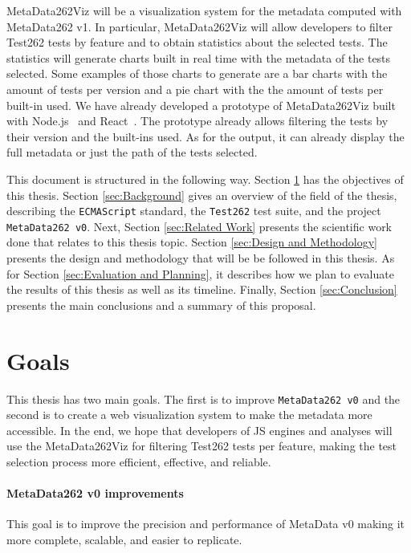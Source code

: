 \documentclass[runningheads]{llncs}
\begin{document}
MetaData262Viz will be a visualization system for the metadata computed with MetaData262 v1. In particular, MetaData262Viz will allow developers to filter Test262 tests by feature and to obtain statistics about the selected tests. The statistics will generate charts built in real time with the metadata of the tests selected. Some examples of those charts to generate are a bar charts with the amount of tests per version and a pie chart with the the amount of tests per built-in used.
We have already developed a prototype of MetaData262Viz built with Node.js~\cite{Node.js} and React~\cite{React}. The prototype already allows filtering the tests by their version and the built-ins used. As for the output, it can already display the full metadata or just the path of the tests selected.


This document is structured in the following way. Section \ref{sec:Goals} has the objectives of this thesis. Section \ref{sec:Background} gives an overview of the field of the thesis, describing the \texttt{ECMAScript} standard, the \texttt{Test262} test suite, and the project \texttt{MetaData262 v0}. Next, Section \ref{sec:Related Work} presents the scientific work done that relates to this thesis topic. Section \ref{sec:Design and Methodology} presents the design and methodology that will be be followed in this thesis. As for Section \ref{sec:Evaluation and Planning}, it describes how we plan to evaluate the results of this thesis as well as its timeline. Finally, Section \ref{sec:Conclusion} presents the main conclusions and a summary of this proposal.



\section{Goals}
\label{sec:Goals}


This thesis has two main goals. The first is to improve \texttt{MetaData262 v0} and the second is to create a web visualization system to make the metadata more accessible.
%
In the end, we hope that developers of JS engines and analyses will use the MetaData262Viz for filtering Test262 tests per feature, making the test selection process more efficient, effective, and reliable.

\paragraph{MetaData262 v0 improvements}
This goal is to improve the precision and performance of MetaData v0 making it more complete, scalable, and easier to replicate.
\end{document}
